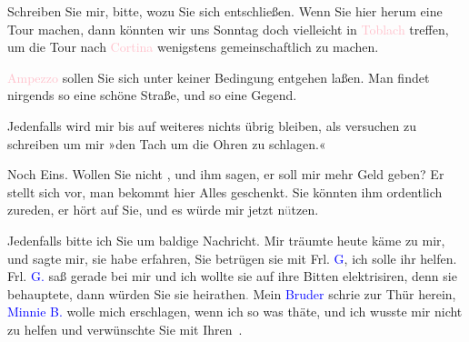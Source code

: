 \pstart
           {\pb}Schreiben Sie mir, bitte,
               wozu Sie sich entschließen. Wenn Sie hier herum eine Tour machen, dann könnten wir
               uns Sonntag doch vielleicht in \textcolor{pink}{Toblach}{}\ledrightnote{\textcolor{pink}{Toblach}} treffen, um die Tour nach \textcolor{pink}{Cortina}{}\ledrightnote{\textcolor{pink}{Cortina d'Ampezzo}} wenigstens gemeinschaftlich zu machen.\pend
           
\pstart
           \textcolor{pink}{Ampezzo}{}\ledrightnote{\textcolor{pink}{Ampezzo}} sollen Sie sich unter keiner Bedingung
               entgehen laßen. Man findet nirgends so eine schöne Straße, und so eine Gegend.\pend
           
\pstart
           Jedenfalls wird mir bis auf weiteres nichts übrig bleiben, als versuchen zu
                  schreiben um mir »den Tach um die Ohren zu schlagen.«\pend
           
\pstart
           Noch Eins. Wollen Sie nicht \label{K_L03128-6v}\label{K_L03128-6h}, und ihm sagen, er
               soll mir mehr Geld geben? Er stellt sich vor, man bekommt hier Alles geschenkt. Sie
               könnten ihm ordentlich zureden, er hört auf Sie, und es würde mir jetzt
                  n\textcolor{gray}{ü}tzen.\pend
           
\pstart
           Jedenfalls bitte ich Sie um baldige Nachricht. Mir träumte heute \label{K_L03128-7v}\label{K_L03128-7h} käme
               zu mir, und sagte mir, sie habe erfahren, Sie betrügen sie mit Frl. \textcolor{blue}{G}{}\ledrightnote{\textcolor{blue}{Marie Glümer}}, ich solle ihr helfen. Frl. \textcolor{blue}{G.}{}\ledrightnote{\textcolor{blue}{Marie Glümer}} saß gerade bei mir und ich wollte sie auf ihre Bitten elektrisiren, denn
               sie behauptete, dann würden Sie sie heirathen\textcolor{gray}{.} Mein \textcolor{blue}{Bruder}{}\ledrightnote{{$\rightarrow$}\textcolor{blue}{Theodor Salzmann}} schrie zur Thür
               herein, \textcolor{blue}{Minnie B.}{}\ledrightnote{\textcolor{blue}{Hermine von Schaffgotsch}} wolle mich erschlagen, wenn
               ich so was thäte, und ich wusste mir nicht zu helfen und verwünschte Sie mit
                  Ihren \label{K_L03128-8v}\label{K_L03128-8h}.\pend
           
